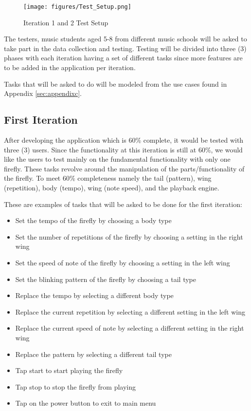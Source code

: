 \begin{figure}[H]
    \centering
    \texttt{[image: figures/Test\_Setup.png]}
    \caption{Iteration 1 and 2 Test Setup}
    \label{test1and2}
\end{figure}

The testers, music students aged 5-8 from different music schools will be asked to take part in the data collection and testing. Testing will be divided into three (3) phases with each iteration having a set of different tasks since more features are to be added in the application per iteration. 

Tasks that will be asked to do will be modeled from the use cases found in Appendix \ref{sec:appendixc}.

\subsection{First Iteration}
After developing the application which is 60\% complete, it would be tested with three (3) users. Since the functionality at this iteration is still at 60\%, we would like the users to test mainly on the fundamental functionality with only one firefly. These tasks revolve around the manipulation of the parts/functionality of the firefly. To meet 60\% completeness namely the tail (pattern), wing (repetition), body (tempo), wing (note speed), and the playback engine. 

These are examples of tasks that will be asked to be done for the first iteration:
\begin{itemize}
    \item Set the tempo of the firefly by choosing a body type
    \item Set the number of repetitions of the firefly by choosing a setting in the right wing
    \item Set the speed of note of the firefly by choosing a setting in the left wing
    \item Set the blinking pattern of the firefly by choosing a tail type
    \item Replace the tempo by selecting a different body type
    \item Replace the current repetition by selecting a different setting in the left wing
    \item Replace the current speed of note by selecting a different setting in the right wing
    \item Replace the pattern by selecting a different tail type
    \item Tap start to start playing the firefly
    \item Tap stop to stop the firefly from playing
    \item Tap on the power button to exit to main menu
\end{itemize}

